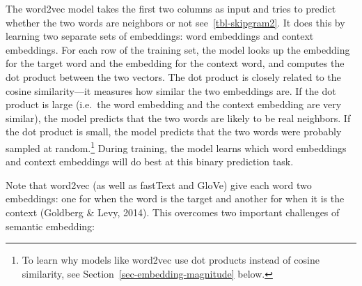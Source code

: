 \documentclass[
  man,
  floatsintext,
  longtable,
  nolmodern,
  notxfonts,
  notimes,
  colorlinks=true,linkcolor=blue,citecolor=blue,urlcolor=blue]{apa7}
\begin{document}
The word2vec model takes the first two columns as input and tries to
predict whether the two words are neighbors or not
see~\ref{tbl-skipgram2}. It does this by learning two separate sets of
embeddings: word embeddings and context embeddings. For each row of the
training set, the model looks up the embedding for the target word and
the embedding for the context word, and computes the dot product between
the two vectors. The dot product is closely related to the cosine
similarity---it measures how similar the two embeddings are. If the dot
product is large (i.e.~the word embedding and the context embedding are
very similar), the model predicts that the two words are likely to be
real neighbors. If the dot product is small, the model predicts that the
two words were probably sampled at random.\footnote{To learn why models
  like word2vec use dot products instead of cosine similarity, see
  Section~\ref{sec-embedding-magnitude} below.} During training, the
model learns which word embeddings and context embeddings will do best
at this binary prediction task.

Note that word2vec (as well as fastText and GloVe) give each word two
embeddings: one for when the word is the target and another for when it
is the context (Goldberg \& Levy, 2014). This overcomes two important
challenges of semantic embedding:
\end{document}
